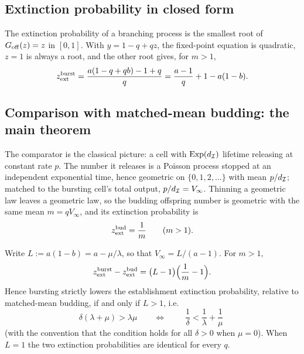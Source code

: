 \subsection{Extinction probability in closed form}

The extinction probability of a branching process is the smallest root of
$G_{\rm off}(z)=z$ in $[0,1]$. With $y=1-q+qz$, the fixed-point equation is
quadratic, $z=1$ is always a root, and the other root gives, for $m>1$,
\begin{equation}
z_{\rm ext}^{\rm burst}
=\frac{a(1-q+qb)-1+q}{q}
=\frac{a-1}{q}+1-a(1-b).
\label{eq:zext}
\end{equation}

\subsection{Comparison with matched-mean budding: the main theorem}

The comparator is the classical picture: a cell with $\mathrm{Exp}(d_{\mathcal{I}})$
lifetime releasing at constant rate $p$. The number it releases is a Poisson
process stopped at an independent exponential time, hence geometric on
$\{0,1,2,\ldots\}$ with mean $p/d_{\mathcal{I}}$; matched to the bursting cell's
total output, $p/d_{\mathcal{I}}=V_\infty$. Thinning a geometric law leaves a
geometric law, so the budding offspring number is geometric with the same
mean $m=qV_\infty$, and its extinction probability is
\begin{equation}
z_{\rm ext}^{\rm bud}=\frac{1}{m}\qquad(m>1).
\end{equation}

\begin{theorem}
\label{thm:flood}
Write $L:=a(1-b)=a-\mu/\lambda$, so that $V_\infty=L/(a-1)$. For $m>1$,
\begin{equation}
z_{\rm ext}^{\rm burst}-z_{\rm ext}^{\rm bud}
=\bigl(L-1\bigr)\Bigl(\frac{1}{m}-1\Bigr).
\label{eq:flood}
\end{equation}
Hence bursting strictly lowers the establishment extinction probability,
relative to matched-mean budding, if and only if $L>1$, i.e.
\begin{equation}
\delta(\lambda+\mu)>\lambda\mu
\qquad\Longleftrightarrow\qquad
\boxed{\;\frac{1}{\delta}<\frac{1}{\lambda}+\frac{1}{\mu}\;}
\end{equation}
(with the convention that the condition holds for all $\delta>0$ when
$\mu=0$). When $L=1$ the two extinction probabilities are identical for
every $q$.
\end{theorem}

